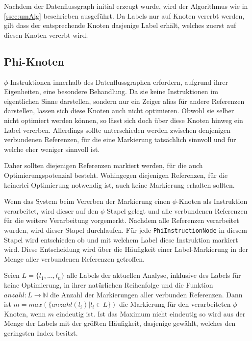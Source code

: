 Nachdem der Datenflussgraph initial erzeugt wurde, wird der Algorithmus wie in \ref{ssec:umAlg} 
beschrieben ausgeführt. Da Labels nur auf Knoten vererbt werden, gilt dass der entsprechende
Knoten dasjenige Label erhält, welches zuerst auf diesen Knoten vererbt wird.  

\subsection{Phi-Knoten}

$\phi$-Instruktionen innerhalb des Datenflussgraphen erfordern, aufgrund ihrer Eigenheiten,
eine besondere Behandlung. Da sie keine Instruktionen im eigentlichen Sinne darstellen, sondern
nur ein Zeiger alias für andere Referenzen darstellen, lassen sich diese Knoten auch nicht
optimieren. Obwohl sie selber nicht optimiert werden können, so lässt sich doch über diese 
Knoten hinweg ein Label vererben. Allerdings sollte unterschieden werden zwischen denjenigen
verbundenen Referenzen, für die eine Markierung tatsächlich sinnvoll und für welche eher
weniger sinnvoll ist. 

Daher sollten diejenigen Referenzen markiert werden, für die auch Optimierungspotenzial 
besteht. Wohingegen diejenigen Referenzen, für die keinerlei Optimierung notwendig 
ist, auch keine Markierung erhalten sollten. 

Wenn das System beim Vererben der Markierung einen $\phi$-Knoten als Instruktion verarbeitet,
wird dieser auf den $\phi$ Stapel gelegt und alle verbundenen Referenzen für die
weitere Verarbeitung vorgemerkt. Nachdem alle Referenzen verarbeitet wurden, wird dieser
Stapel durchlaufen. Für jede \texttt{PhiInstructionNode} in diesem Stapel wird entschieden
ob und mit welchem Label diese Instruktion markiert wird. Diese Entscheidung wird über
die Häufigkeit einer Label-Markierung in der Menge aller verbundenen Referenzen 
getroffen. 

Seien $L = \{l_1,...,l_n\}$ alle Labels der aktuellen Analyse, inklusive des Labels 
für keine Optimierung, in ihrer natürlichen Reihenfolge und die Funktion 
$anzahl: L \rightarrow \mathbb{N}$ die Anzahl der Markierungen aller verbunden Referenzen. 
Dann ist $m = max(\{anzahl(l_i) | l_i \in L\})$ die Markierung für den verarbeiteten $\phi$-Knoten, 
wenn $m$ eindeutig ist. Ist das Maximum nicht eindeutig so wird aus der Menge der 
Labels mit der größten Häufigkeit, dasjenige gewählt, welches den geringsten Index besitzt.